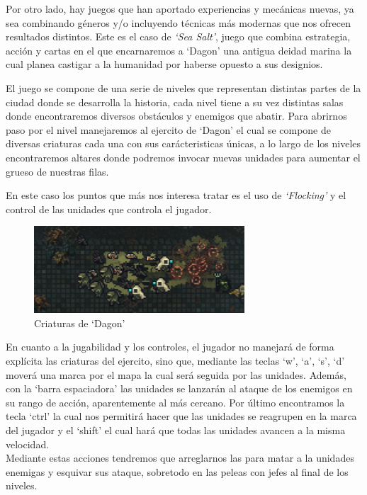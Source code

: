 Por otro lado, hay juegos que han aportado experiencias y mecánicas nuevas, ya sea combinando
géneros y/o incluyendo técnicas más modernas que nos ofrecen resultados distintos. Este es el
caso de \textit{`Sea Salt'}, juego que combina estrategia, acción y cartas en el que encarnaremos 
a `Dagon' una antigua deidad marina la cual planea castigar a la humanidad por haberse 
opuesto a sus designios.

El juego se compone de una serie de niveles que representan distintas partes de la ciudad
donde se desarrolla la historia, cada nivel tiene a su vez distintas salas donde encontraremos
diversos obstáculos y enemigos que abatir. Para abrirnos paso por el nivel manejaremos al
ejercito de `Dagon' el cual se compone de diversas criaturas cada una con sus carácteristicas 
únicas, a lo largo de los niveles encontraremos altares donde podremos invocar nuevas unidades
para aumentar el grueso de nuestras filas. 

En este caso los puntos que más nos interesa tratar es el uso de \textit{`Flocking'} y el 
control de las unidades que controla el jugador.

\begin{figure}[ht]
\centering
\includegraphics[width=0.7\textwidth]{imagenes/marco_teo/referentes/ss_4.png}
\caption{Criaturas de `Dagon'}
\label{img:ss_4}
\end{figure}

En cuanto a la jugabilidad y los controles, el jugador no manejará de forma
explícita las criaturas del ejercito, sino que, mediante las teclas `w', `a', `s', `d'
moverá una marca por el mapa la cual será seguida por las unidades. Además, con la
`barra espaciadora' las unidades se lanzarán al ataque de los enemigos en su rango de 
acción, aparentemente al más cercano. Por último encontramos la tecla `ctrl' la cual
nos permitirá hacer que las unidades se reagrupen en la marca del jugador y el `shift'
el cual 
hará que todas las unidades avancen a la misma velocidad. \\
Mediante estas acciones tendremos que arreglarnos las para matar a la unidades enemigas y
esquivar sus ataque, sobretodo en las peleas con jefes al final de los niveles.

